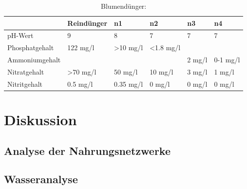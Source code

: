\documentclass{article}
\begin{document}
        \begin{table}[H]
        \centering
        \caption{Blumendünger:}
        \label{tab:my-table}
        \begin{tabular}{@{}llllll@{}}
        \toprule
         & Reindünger & n1 & n2 & n3 & n4 \\ \midrule
        pH-Wert & 9 & 8 & 7 & 7 & 7 \\
        Phosphatgehalt & 122 mg/l & \textgreater{}10 mg/l & \textless{}1.8 mg/l &  &  \\
        Ammoniumgehalt &  &  &  & 2 mg/l & 0-1 mg/l \\
        Nitratgehalt & \textgreater{}70 mg/l & 50 mg/l & 10 mg/l & 3 mg/l & 1 mg/l \\
        Nitritgehalt & 0.5 mg/l & 0.35 mg/l & 0 mg/l & 0 mg/l & 0 mg/l \\ \bottomrule
        \end{tabular}
        \end{table}
                        


\section{Diskussion}

    \subsection{Analyse der Nahrungsnetzwerke}
    
        
    
    \subsection{Wasseranalyse}
        
\end{document}

